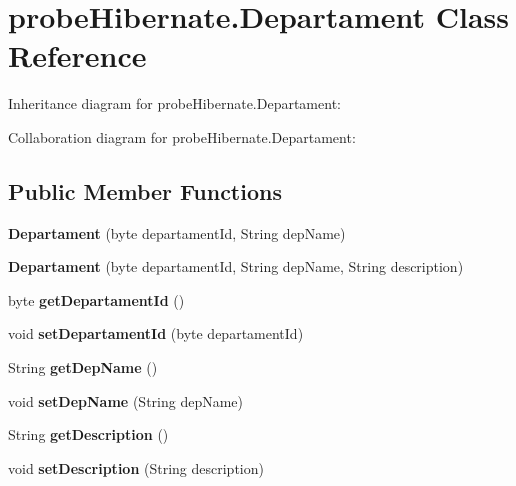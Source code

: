 \hypertarget{classprobe_hibernate_1_1_departament}{}\section{probe\+Hibernate.\+Departament Class Reference}
\label{classprobe_hibernate_1_1_departament}


Inheritance diagram for probe\+Hibernate.\+Departament\+:


Collaboration diagram for probe\+Hibernate.\+Departament\+:
\subsection*{Public Member Functions}
\begin{DoxyCompactItemize}
\item 
\mbox{\label{classprobe_hibernate_1_1_departament_a5eb9f9706244d85c822a7066cda76b0b}} 
{\bfseries Departament} (byte departament\+Id, String dep\+Name)
\item 
\mbox{\label{classprobe_hibernate_1_1_departament_ab6d12a399672383f1e44860575704f93}} 
{\bfseries Departament} (byte departament\+Id, String dep\+Name, String description)
\item 
\mbox{\label{classprobe_hibernate_1_1_departament_a43133c71914c9dfc7669861111b6c271}} 
byte {\bfseries get\+Departament\+Id} ()
\item 
\mbox{\label{classprobe_hibernate_1_1_departament_a9b517d976bd944aef8b337636dd9d09e}} 
void {\bfseries set\+Departament\+Id} (byte departament\+Id)
\item 
\mbox{\label{classprobe_hibernate_1_1_departament_af0e838a2d10e31cde185e5d91319c9d7}} 
String {\bfseries get\+Dep\+Name} ()
\item 
\mbox{\label{classprobe_hibernate_1_1_departament_acdaf494e1c02d04e0219fe23046f188c}} 
void {\bfseries set\+Dep\+Name} (String dep\+Name)
\item 
\mbox{\label{classprobe_hibernate_1_1_departament_a6b9eda942a4705f278989f57a7c6c247}} 
String {\bfseries get\+Description} ()
\item 
\mbox{\label{classprobe_hibernate_1_1_departament_a32a669f1563f066c8e3f415c503cee8a}} 
void {\bfseries set\+Description} (String description)
\end{DoxyCompactItemize}


